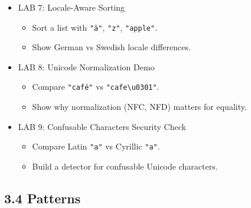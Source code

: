 \documentclass[
  letterpaper,
  DIV=11,
  numbers=noendperiod]{scrreprt}
\providecommand{\tightlist}{%
  \setlength{\itemsep}{0pt}\setlength{\parskip}{0pt}}
\begin{document}
\begin{itemize}
\item
  LAB 7: Locale-Aware Sorting

  \begin{itemize}
  \tightlist
  \item
    Sort a list with \texttt{"ä"}, \texttt{"z"}, \texttt{"apple"}.
  \item
    Show German vs Swedish locale differences.
  \end{itemize}
\item
  LAB 8: Unicode Normalization Demo

  \begin{itemize}
  \tightlist
  \item
    Compare \texttt{"café"} vs \texttt{"cafe\textbackslash{}u0301"}.
  \item
    Show why normalization (NFC, NFD) matters for equality.
  \end{itemize}
\item
  LAB 9: Confusable Characters Security Check

  \begin{itemize}
  \tightlist
  \item
    Compare Latin \texttt{"a"} vs Cyrillic \texttt{"а"}.
  \item
    Build a detector for confusable Unicode characters.
  \end{itemize}
\end{itemize}

\subsection{3.4 Patterns}\label{patterns-2}
\end{document}
